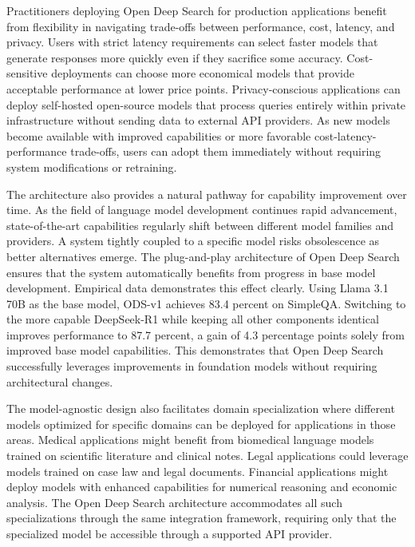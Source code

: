Practitioners deploying Open Deep Search for production applications benefit from flexibility in navigating trade-offs between performance, cost, latency, and privacy. Users with strict latency requirements can select faster models that generate responses more quickly even if they sacrifice some accuracy. Cost-sensitive deployments can choose more economical models that provide acceptable performance at lower price points. Privacy-conscious applications can deploy self-hosted open-source models that process queries entirely within private infrastructure without sending data to external API providers. As new models become available with improved capabilities or more favorable cost-latency-performance trade-offs, users can adopt them immediately without requiring system modifications or retraining.

The architecture also provides a natural pathway for capability improvement over time. As the field of language model development continues rapid advancement, state-of-the-art capabilities regularly shift between different model families and providers. A system tightly coupled to a specific model risks obsolescence as better alternatives emerge. The plug-and-play architecture of Open Deep Search ensures that the system automatically benefits from progress in base model development. Empirical data demonstrates this effect clearly. Using Llama 3.1 70B as the base model, ODS-v1 achieves 83.4 percent on SimpleQA. Switching to the more capable DeepSeek-R1 while keeping all other components identical improves performance to 87.7 percent, a gain of 4.3 percentage points solely from improved base model capabilities. This demonstrates that Open Deep Search successfully leverages improvements in foundation models without requiring architectural changes.

The model-agnostic design also facilitates domain specialization where different models optimized for specific domains can be deployed for applications in those areas. Medical applications might benefit from biomedical language models trained on scientific literature and clinical notes. Legal applications could leverage models trained on case law and legal documents. Financial applications might deploy models with enhanced capabilities for numerical reasoning and economic analysis. The Open Deep Search architecture accommodates all such specializations through the same integration framework, requiring only that the specialized model be accessible through a supported API provider.

